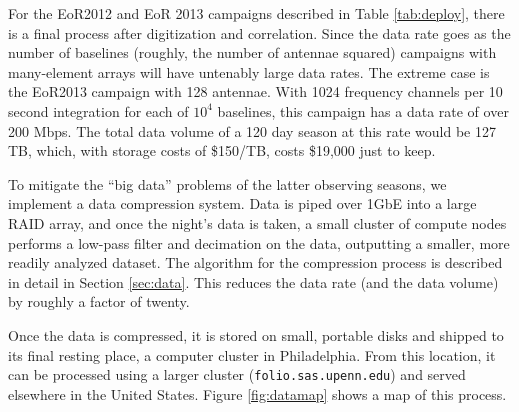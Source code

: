 For the EoR2012 and EoR 2013 campaigns described in Table \ref{tab:deploy}, there is a final
process after digitization and correlation. Since the data rate goes as the number of baselines
(roughly, the number of antennae squared) campaigns with many-element arrays will have untenably large data
rates. The extreme case is the EoR2013 campaign with 128 antennae. With 1024 frequency channels per 
10 second integration for each of $10^4$ baselines, this campaign has a data rate of over 200 Mbps.
The total data volume of a 120 day season at this rate would be 127 TB, which, with storage costs of
\$150/TB, costs \$19,000 just to keep.

To mitigate the ``big data'' problems of the latter observing seasons, we implement a data
compression system. Data is piped over 1GbE into a large RAID array, and once the night's data is
taken, a small cluster of compute nodes performs a low-pass filter and decimation on the data,
outputting a smaller, more readily analyzed dataset. The algorithm for the compression process 
is described in detail in Section \ref{sec:data}. This reduces the data rate (and the data volume)
by roughly a factor of twenty.

Once the data is compressed, it is stored on small, portable disks and shipped to its final resting
place, a computer cluster in Philadelphia. From this location, it can be processed using a larger
cluster ({\tt folio.sas.upenn.edu}) and served elsewhere in the United States. Figure 
\ref{fig:datamap} shows a map of this process.
